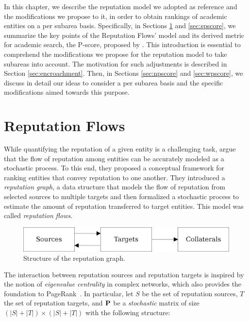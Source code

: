 \documentclass[msc]{ppgccufmg}
\begin{document}
In this chapter, we describe the reputation model we adopted as reference and the modifications we propose to it, in order to obtain rankings of academic entities on a per subarea basis. Specifically, in Sections \ref{sec:flows} and \ref{sec:spscore}, we summarize the key points of the Reputation Flows' model and its derived metric for academic search, the P-score, proposed by \cite{ribas2015bigscholar}. This introduction is essential to comprehend the modifications we propose for the reputation model to take subareas into account. The motivation for such adjustments is described in Section \ref{sec:encroachment}. Then, in Sections \ref{sec:npscore} and \ref{sec:wpscore}, we discuss in detail our ideas to consider a per subarea basis and the specific modifications aimed towards this purpose.

\section{Reputation Flows}\label{sec:flows}

While quantifying the reputation of a given entity is a challenging task, \cite{ribas2015random} argue that the flow of reputation among entities can be accurately modeled as a stochastic process. To this end, they proposed a conceptual framework for ranking entities that convey reputation to one another. They introduced a \textit{reputation graph}, a data structure that models the flow of reputation from selected sources to multiple targets and then formalized a stochastic process to estimate the amount of reputation transferred to target entities. This model was called \textit{reputation flows}.

\begin{figure}[h]
   \centerline{\includegraphics[width=.7\linewidth]{fig/overview-line}}
   \caption{Structure of the reputation graph.}
   \label{fig:rgraph}
\end{figure}

The interaction between reputation sources and reputation targets is inspired by the notion of {\em eigenvalue centrality} in complex networks, which also provides the foundation to PageRank~\citep{brin98}. In particular, let $S$ be the set of reputation sources, $T$ the set of reputation targets, and ${\bf P}$ be a \emph{stochastic} matrix of size $(|S|+|T|) \times (|S|+|T|)$ with the following structure: 
\end{document}
